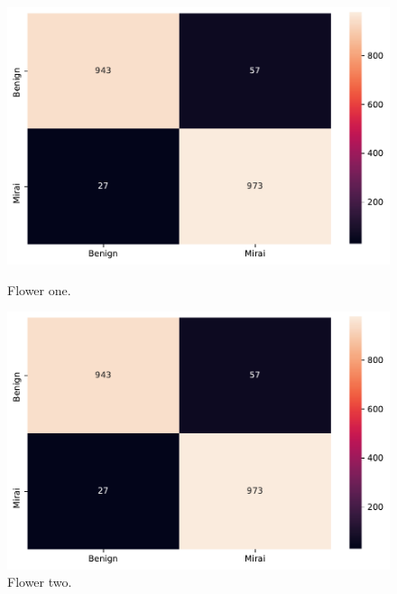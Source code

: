 \documentclass{article}
\begin{document}
\begin{figure}[!tbp]
  \centering
  \begin{minipage}[b]{0.3\textwidth}
    \includegraphics[width=\textwidth]{1.pdf}
    \caption{Flower one.}
  \end{minipage}
  \begin{minipage}[b]{0.3\textwidth}
    \includegraphics[width=\textwidth]{1.pdf}
    \caption{Flower two.}
  \end{minipage}


\end{figure}
\end{document}
